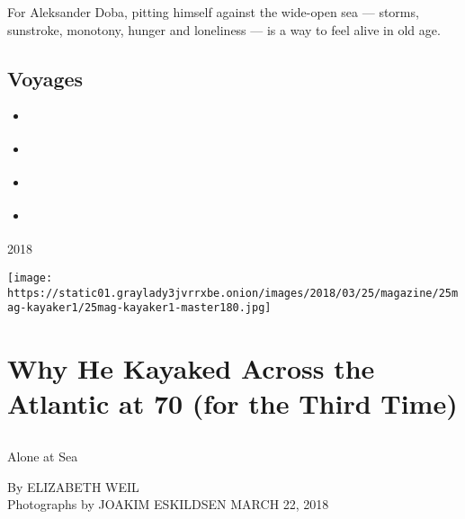 For Aleksander Doba, pitting himself against the wide-open sea ---
storms, sunstroke, monotony, hunger and loneliness --- is a way to feel
alive in old age.

\hypertarget{voyages}{%
\subsection{Voyages}\label{voyages}}

\begin{itemize}
\tightlist
\item
  \href{https://www.nytimes3xbfgragh.onion/interactive/2018/03/22/magazine/voyages-kayaking-across-ocean-at-70.html?action=click\&module=MagazineModule\&pgtype=Article\&contentCollection=Magazine\&region=Header}{}
\item
  \href{https://www.nytimes3xbfgragh.onion/interactive/2018/03/22/magazine/voyages-worlds-greatest-hitchhiker.html?action=click\&module=MagazineModule\&pgtype=Article\&contentCollection=Magazine\&region=Header}{}
\item
  \href{https://www.nytimes3xbfgragh.onion/interactive/2018/03/22/magazine/voyages-nathalie-cabrol-searching-mars-life-on-earth.html?action=click\&module=MagazineModule\&pgtype=Article\&contentCollection=Magazine\&region=Header}{}
\item
  \href{https://www.nytimes3xbfgragh.onion/interactive/2018/03/22/magazine/voyages-joshua-tree-lost-hiker.html?action=click\&module=MagazineModule\&pgtype=Article\&contentCollection=Magazine\&region=Header}{}
\end{itemize}

2018

\texttt{[image: https://static01.graylady3jvrrxbe.onion/images/2018/03/25/magazine/25mag-kayaker1/25mag-kayaker1-master180.jpg]}

\hypertarget{why-he-kayaked-across-the-atlantic-at-70-for-the-third-time-1}{%
\section{Why He Kayaked Across the Atlantic at 70 (for the Third
Time)}\label{why-he-kayaked-across-the-atlantic-at-70-for-the-third-time-1}}

\subsection{}

Alone at Sea

By ELIZABETH WEIL\\
Photographs by JOAKIM ESKILDSEN MARCH 22, 2018

